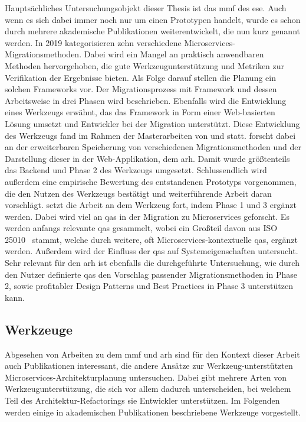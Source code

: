 Hauptsächliches Untersuchungsobjekt dieser Thesis ist das \gls{mmf} des \gls{ese}.
Auch wenn es sich dabei immer noch nur um einen Prototypen handelt, wurde es schon durch mehrere akademische Publikationen weiterentwickelt, die nun kurz genannt werden.
In 2019 kategorisieren  zehn verschiedene Microservices-Migrationsmethoden.
Dabei wird ein Mangel an praktisch anwendbaren Methoden hervorgehoben, die gute Werkzeugunterstützung und Metriken zur Verifikation der Ergebnisse bieten.
Als Folge darauf stellen  die Planung ein solchen Frameworks vor.
Der Migrationsprozess mit Framework und dessen Arbeitsweise in drei Phasen wird beschrieben.
Ebenfalls wird die Entwicklung eines Werkzeugs erwähnt, das das Framework in Form einer Web-basierten Lösung umsetzt und Entwickler bei der Migration unterstützt.
Diese Entwicklung des Werkzeugs fand im Rahmen der Masterarbeiten von  und  statt.
 forscht dabei an der erweiterbaren Speicherung von verschiedenen Migrationsmethoden und der Darstellung dieser in der Web-Applikation, dem \gls{arh}.
Damit wurde größtenteils das Backend und Phase 2 des Werkzeugs umgesetzt.
Schlussendlich wird außerdem eine empirische Bewertung des entstandenen Prototyps vorgenommen, die den Nutzen des Werkzeugs bestätigt und weiterführende Arbeit daran vorschlägt.
 setzt die Arbeit an dem Werkzeug fort, indem Phase 1 und 3 ergänzt werden.
Dabei wird viel an \glspl{qa} in der Migration zu Microservices geforscht.
Es werden anfangs relevante \glspl{qa} gesammelt, wobei ein Großteil davon aus ISO 25010~\cite{ISO-25010} stammt, welche durch weitere, oft Microservices-kontextuelle \glspl{qa}, ergänzt werden.
Außerdem wird der Einfluss der \glspl{qa} auf Systemeigenschaften untersucht.
Sehr relevant für den \gls{arh} ist ebenfalls die durchgeführte Untersuchung, wie durch den Nutzer definierte \glspl{qa} den Vorschlag passender Migrationsmethoden in Phase 2, sowie profitabler Design Patterns und Best Practices in Phase 3 unterstützen kann.

\subsection{Werkzeuge}

Abgesehen von Arbeiten zu dem \gls{mmf} und \gls{arh} sind für den Kontext dieser Arbeit auch Publikationen interessant, die andere Ansätze zur Werkzeug-unterstützten Microservices-Architekturplanung untersuchen.
Dabei gibt mehrere Arten von Werkzeugunterstützung, die sich vor allem dadurch unterscheiden, bei welchem Teil des Architektur-Refactorings sie Entwickler unterstützen.
Im Folgenden werden einige in akademischen Publikationen beschriebene Werkzeuge vorgestellt.

